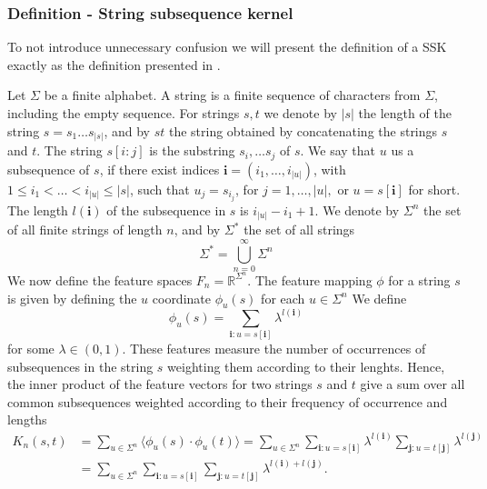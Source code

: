 \subsubsection{Definition - String subsequence kernel}
To not introduce unnecessary confusion we will present the definition of a SSK exactly as the definition presented in \cite{lodhi}. 

Let $ \Sigma $ be a finite alphabet. A string is a finite sequence of characters from $ \Sigma $, including the empty sequence. For strings $s,t$ we denote by $|s|$ the length of the string $ s = s_1 \dots s_{|s|} $, and by $ st $ the string obtained by concatenating the strings $ s $ and $ t $. The string $ s[i:j] $ is the substring $ s_i, \dots s_j $ of $ s $. We say that $ u $ us a subsequence of $ s $, if there exist indices $ \boldsymbol{i} = (i_1, \dots, i_{|u|}) $, with $ 1 \leq i_1 < \dots < i_{|u|} \leq |s| $, such that $ u_j = s_{i_{j}}$, for $ j = 1, \dots, |u|, $ or $ u = s[\boldsymbol{i}] $ for short. The length $ l(\boldsymbol{i}) $ of the subsequence in $ s $ is $ i_{|u|} - i_1 +1 $. We denote by $ \Sigma^n $ the set of all finite strings of length $ n $, and by $ \Sigma^* $ the set of all strings 
\begin{equation}\label{eq:all_Strings}
\Sigma^* = \bigcup^{\infty}_{n=0}\Sigma^n
\end{equation}
We now define the feature spaces $ F_n = \mathbb{R}^{\Sigma^{n}} $. The feature mapping $ \phi $ for a string $ s $ is given by defining the $ u $ coordinate $ \phi_u(s) $ for each $u \in \Sigma^n  $ We define 
\begin{equation}
\phi_u(s) = \sum_{\boldsymbol{i}:u=s[\boldsymbol{i}]} \lambda^{l(\boldsymbol{i})}
\end{equation}
for some $ \lambda \in (0,1) $. These features measure the number of occurrences of subsequences in the string $ s $ weighting them according to their lenghts. Hence, the inner product of the feature vectors for two strings $ s $ and $ t $ give a sum over all common subsequences weighted according to their frequency of occurrence and lengths
\begin{align*}\label{key}
K_n(s,t) &= \sum_{u\in\Sigma^n} \langle \phi_u(s) \cdot \phi_u(t) \rangle = \sum_{u \in \Sigma^n} \sum_{\boldsymbol{i}:u=s[\boldsymbol{i}]} \lambda^{l(\boldsymbol{i})} \sum_{\boldsymbol{j}:u=t[\boldsymbol{j}]} \lambda^{l(\boldsymbol{j})} \\
& =  \sum_{u \in \Sigma^n} \sum_{\boldsymbol{i}:u=s[\boldsymbol{i}]}  \sum_{\boldsymbol{j}:u=t[\boldsymbol{j}]} \lambda^{l(\boldsymbol{i}) + l(\boldsymbol{j})}.
\end{align*}


